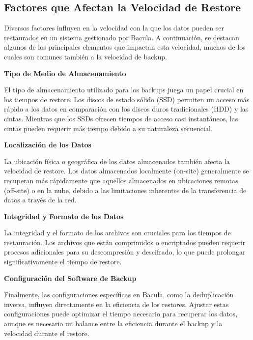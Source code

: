 \subsection{Factores que Afectan la Velocidad de Restore}

Diversos factores influyen en la velocidad con la que los datos pueden ser restaurados en un sistema gestionado por Bacula. A continuación, se destacan algunos de los principales elementos que impactan esta velocidad, muchos de los cuales son comunes también a la velocidad de backup.

\textbf{Tipo de Medio de Almacenamiento}

El tipo de almacenamiento utilizado para los backups juega un papel crucial en los tiempos de restore. Los discos de estado sólido (SSD) permiten un acceso más rápido a los datos en comparación con los discos duros tradicionales (HDD) y las cintas. Mientras que los SSDs ofrecen tiempos de acceso casi instantáneos, las cintas pueden requerir más tiempo debido a su naturaleza secuencial.

\textbf{Localización de los Datos}

La ubicación física o geográfica de los datos almacenados también afecta la velocidad de restore. Los datos almacenados localmente (on-site) generalmente se recuperan más rápidamente que aquellos almacenados en ubicaciones remotas (off-site) o en la nube, debido a las limitaciones inherentes de la transferencia de datos a través de la red.

\textbf{Integridad y Formato de los Datos}

La integridad y el formato de los archivos son cruciales para los tiempos de restauración. Los archivos que están comprimidos o encriptados pueden requerir procesos adicionales para su descompresión y descifrado, lo que puede prolongar significativamente el tiempo de restore.

\textbf{Configuración del Software de Backup}

Finalmente, las configuraciones específicas en Bacula, como la deduplicación inversa, influyen directamente en la eficiencia de los restores. Ajustar estas configuraciones puede optimizar el tiempo necesario para recuperar los datos, aunque es necesario un balance entre la eficiencia durante el backup y la velocidad durante el restore.
